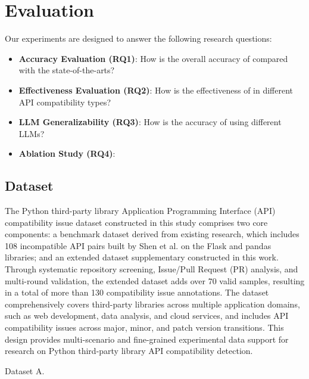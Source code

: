 
\section{Evaluation}

Our experiments are designed to answer the following research questions:

\begin{itemize}
    \item \textbf{Accuracy Evaluation (RQ1)}: How is the overall accuracy of \tool compared with the state-of-the-arts? 
    \item \textbf{Effectiveness Evaluation (RQ2)}: How is the effectiveness of \tool in different API compatibility types? %
    \item \textbf{LLM Generalizability (RQ3)}: How is the accuracy of \tool using different LLMs?
    \item \textbf{Ablation Study (RQ4)}: 
\end{itemize}


\subsection{Dataset}

The Python third-party library Application Programming Interface (API) compatibility issue dataset constructed in this study comprises two core components: a benchmark dataset derived from existing research, which includes 108 incompatible API pairs built by Shen et al. on the Flask and pandas libraries; and an extended dataset supplementary constructed in this work. Through systematic repository screening, Issue/Pull Request (PR) analysis, and multi-round validation, the extended dataset adds over 70 valid samples, resulting in a total of more than 130 compatibility issue annotations. The dataset comprehensively covers third-party libraries across multiple application domains, such as web development, data analysis, and cloud services, and includes API compatibility issues across major, minor, and patch version transitions. This design provides multi-scenario and fine-grained experimental data support for research on Python third-party library API compatibility detection.

Dataset A.

